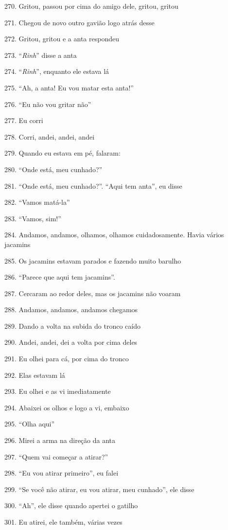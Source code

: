 270. Gritou, passou por cima do amigo dele, gritou, gritou

271. Chegou de novo outro gavião logo atrás desse

272. Gritou, gritou e a anta respondeu

273. ``\emph{Rinh}'' disse a anta

274. ``\emph{Rinh}'', enquanto ele estava lá

275. ``Ah, a anta! Eu vou matar esta anta!''

276. ``Eu não vou gritar não''

277. Eu corri

278. Corri, andei, andei, andei

279. Quando eu estava em pé, falaram:

280. ``Onde está, meu cunhado?''

281. ``Onde está, meu cunhado?''. ``Aqui tem anta'', eu disse

282. ``Vamos matá-la''

283. ``Vamos, sim!''

284. Andamos, andamos, olhamos, olhamos cuidadosamente. Havia vários jacamins

285. Os jacamins estavam parados e fazendo muito barulho

286. ``Parece que aqui tem jacamins''.

287. Cercaram ao redor deles, mas os jacamins não voaram

288. Andamos, andamos, andamos chegamos

289. Dando a volta na subida do tronco caído

290. Andei, andei, dei a volta por cima deles

291. Eu olhei para cá, por cima do tronco

292. Elas estavam lá

293. Eu olhei e as vi imediatamente

294. Abaixei os olhos e logo a vi, embaixo

295. ``Olha aqui''

296. Mirei a arma na direção da anta

297. ``Quem vai começar a atirar?''

298. ``Eu vou atirar primeiro'', eu falei

299. ``Se você não atirar, eu vou atirar, meu cunhado'', ele disse

300. ``Ah'', ele disse quando apertei o gatilho

301. Eu atirei, ele também, várias vezes

